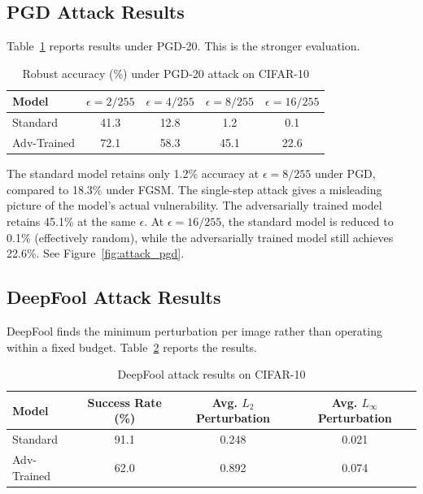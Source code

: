 \subsection{PGD Attack Results}

Table~\ref{tab:pgd_results} reports results under PGD-20. This is the stronger evaluation.

\begin{table}[htbp]
    \centering
    \caption{Robust accuracy (\%) under PGD-20 attack on CIFAR-10}
    \label{tab:pgd_results}
    \begin{tabular}{lcccc}
        \toprule
        \textbf{Model} & $\epsilon=2/255$ & $\epsilon=4/255$ & $\epsilon=8/255$ & $\epsilon=16/255$ \\
        \midrule
        Standard & 41.3 & 12.8 & 1.2 & 0.1 \\
        Adv-Trained & 72.1 & 58.3 & 45.1 & 22.6 \\
        \bottomrule
    \end{tabular}
\end{table}

The standard model retains only 1.2\% accuracy at $\epsilon = 8/255$ under PGD, compared to 18.3\% under FGSM. The single-step attack gives a misleading picture of the model's actual vulnerability. The adversarially trained model retains 45.1\% at the same $\epsilon$. At $\epsilon = 16/255$, the standard model is reduced to 0.1\% (effectively random), while the adversarially trained model still achieves 22.6\%. See Figure~\ref{fig:attack_pgd}.

\subsection{DeepFool Attack Results}

DeepFool finds the minimum perturbation per image rather than operating within a fixed budget. Table~\ref{tab:deepfool_results} reports the results.

\begin{table}[htbp]
    \centering
    \caption{DeepFool attack results on CIFAR-10}
    \label{tab:deepfool_results}
    \begin{tabular}{lccc}
        \toprule
        \textbf{Model} & \textbf{Success Rate (\%)} & \textbf{Avg. $L_2$ Perturbation} & \textbf{Avg. $L_\infty$ Perturbation} \\
        \midrule
        Standard & 91.1 & 0.248 & 0.021 \\
        Adv-Trained & 62.0 & 0.892 & 0.074 \\
        \bottomrule
    \end{tabular}
\end{table}

